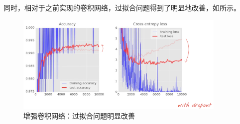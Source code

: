 \begin{content}
同时，相对于之前实现的卷积网络，过拟合问题得到了明显地改善，如所示。

\begin{figure}[H]
\centering
\includegraphics[width=0.9\textwidth]{figures/mnist-conv2d-3-result.png}
\caption{增强卷积网络：过拟合问题明显改善}
 \label{fig:mnist-conv2d-3-result}
\end{figure}

\end{content}